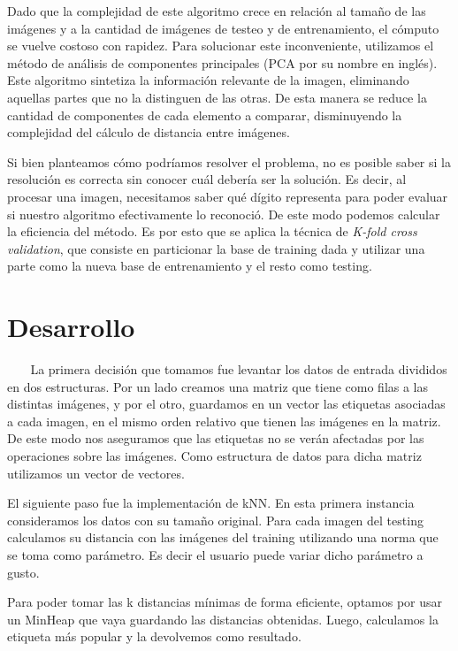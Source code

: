 \documentclass{article}
\begin{document}
Dado que la complejidad de este algoritmo crece en relación al tamaño de las imágenes y a la cantidad de imágenes de testeo y de entrenamiento, el cómputo se vuelve costoso con rapidez. Para solucionar este inconveniente, utilizamos el método de análisis de componentes principales (PCA por su nombre en inglés). Este algoritmo sintetiza la información relevante de la imagen, eliminando aquellas partes que no la distinguen de las otras. De esta manera se reduce la cantidad de componentes de cada elemento a comparar, disminuyendo la complejidad del cálculo de distancia entre imágenes.


Si bien planteamos cómo podríamos resolver el problema, no es posible saber si la resolución es correcta sin conocer cuál debería ser la solución. Es decir, al procesar una imagen, necesitamos saber qué dígito representa para poder evaluar si nuestro algoritmo efectivamente lo reconoció. De este modo podemos calcular la eficiencia del método. Es por esto que se aplica la técnica de \textit{K-fold cross validation}, que consiste en particionar la base de training dada y utilizar una parte como la nueva base de entrenamiento y el resto como testing.



\pagebreak



\section*{Desarrollo}{}

$\ $ $\ $ $\ $ $\ $La primera decisión que tomamos fue levantar los datos de entrada  divididos en dos estructuras. Por un lado creamos una matriz que tiene como filas a las distintas imágenes, y por el otro, guardamos en un vector las etiquetas asociadas a cada imagen, en el mismo orden relativo que tienen las imágenes en la matriz. De este modo nos aseguramos que las etiquetas no se verán afectadas por las operaciones sobre las imágenes. Como estructura de datos para dicha matriz utilizamos un vector de vectores.

El siguiente paso fue la implementación de kNN. En esta primera instancia consideramos los datos con su tamaño original. Para cada imagen del testing calculamos su distancia con las imágenes del training utilizando una norma que se toma como parámetro. Es decir el usuario puede variar dicho parámetro a gusto. 

Para poder tomar las k distancias mínimas de forma eficiente, optamos por usar un MinHeap que vaya guardando las distancias obtenidas. Luego, calculamos la etiqueta más popular y la devolvemos como resultado.
\end{document}
